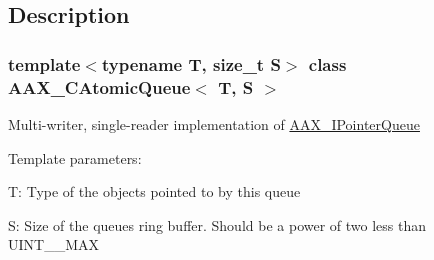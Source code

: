 \subsection{Description}
\subsubsection*{template$<$typename T, size\+\_\+t S$>$\newline
class A\+A\+X\+\_\+\+C\+Atomic\+Queue$<$ T, S $>$}

Multi-\/writer, single-\/reader implementation of \mbox{\hyperlink{a01861}{A\+A\+X\+\_\+\+I\+Pointer\+Queue}}

Template parameters\+:
\begin{DoxyItemize}
\item {\ttfamily T\+:} Type of the objects pointed to by this queue
\item {\ttfamily S\+:} Size of the queue\textquotesingle{}s ring buffer. Should be a power of two less than {\ttfamily U\+I\+N\+T\+\_\+\_\+\+M\+AX} 
\end{DoxyItemize}

